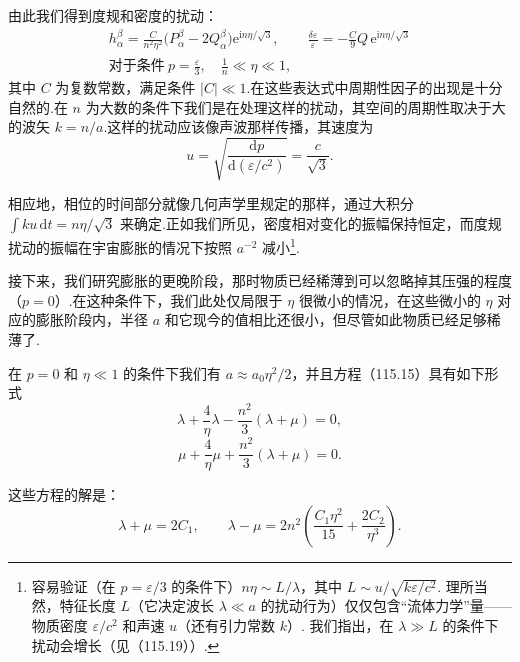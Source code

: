 由此我们得到度规和密度的扰动：
\begin{equation}
  \begin{gathered}
    h_{\alpha}^{\beta}
    =\frac{C}{n^{2}\eta^{2}}
    \bigl(P_{\alpha}^{\beta}-2Q_{\alpha}^{\beta}\bigr)
    \mathrm{e}^{\mathrm{i}n\eta/\sqrt{3}},\qquad
    \frac{\delta\varepsilon}{\varepsilon}
    =-\frac{C}{9}Q\,\mathrm{e}^{\mathrm{i}n\eta/\sqrt{3}}\\
    \text{对于条件}\ p=\frac{\varepsilon}{3},\quad
    \frac{1}{n}\ll\eta\ll1,
  \end{gathered}
\end{equation}
其中 $C$ 为复数常数，满足条件 $|C|\ll1$.在这些表达式中周期性因子的出现是十分自然的.在 $n$ 为大数的条件下我们是在处理这样的扰动，其空间的周期性取决于大的波矢 $k=n/a$.这样的扰动应该像声波那样传播，其速度为
\begin{equation*}
  u=\sqrt{\frac{\mathrm{d}p}{\mathrm{d}(\varepsilon/c^{2})}}
  =\frac{c}{\sqrt{3}}.
\end{equation*}

相应地，相位的时间部分就像几何声学里规定的那样，通过大积分 $\int ku\,\mathrm{d}t=n\eta/\sqrt{3}$ 来确定.正如我们所见，密度相对变化的振幅保持恒定，而度规扰动的振幅在宇宙膨胀的情况下按照 $a^{-2}$ 减小\footnote{容易验证（在 $p=\varepsilon/3$ 的条件下）$n\eta\sim L/\lambda$，其中 $L\sim u/\sqrt{k\varepsilon/c^{2}}$. 理所当然，特征长度 $L$（它决定波长 $\lambda\ll a$ 的扰动行为）仅仅包含“流体力学”量——物质密度 $\varepsilon/c^{2}$ 和声速 $u$（还有引力常数 $k$）. 我们指出，在 $\lambda\gg L$ 的条件下扰动会增长（见（115.19））.}.

接下来，我们研究膨胀的更晚阶段，那时物质已经稀薄到可以忽略掉其压强的程度（$p=0$）.在这种条件下，我们此处仅局限于 $\eta$ 很微小的情况，在这些微小的 $\eta$ 对应的膨胀阶段内，半径 $a$ 和它现今的值相比还很小，但尽管如此物质已经足够稀薄了.

在 $p=0$ 和 $\eta\ll1$ 的条件下我们有 $a\approx a_{0}\eta^{2}/2$，并且方程（115.15）具有如下形式
\begin{equation*}
  \lambda+\frac{4}{\eta}\lambda
  -\frac{n^{2}}{3}(\lambda+\mu)=0,
\end{equation*}
\begin{equation*}
  \mu+\frac{4}{\eta}\mu
  +\frac{n^{2}}{3}(\lambda+\mu)=0.
\end{equation*}

这些方程的解是：
\begin{equation*}
  \lambda+\mu=2C_{1},\qquad
  \lambda-\mu=2n^{2}\left(\frac{C_{1}\eta^{2}}{15}
  +\frac{2C_{2}}{\eta^{3}}\right).
\end{equation*}

